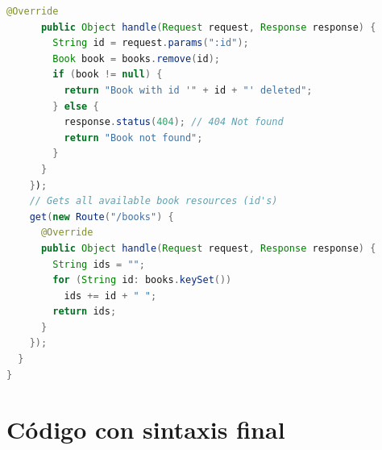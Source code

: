 \documentclass[runningheads]{llncs}
\begin{document}
\begin{center}
\begin{lstlisting}[language=java, basicstyle = \footnotesize, xleftmargin=-.1\textwidth]
      @Override
      public Object handle(Request request, Response response) {
        String id = request.params(":id");
        Book book = books.remove(id);
        if (book != null) {
          return "Book with id '" + id + "' deleted";
        } else {
          response.status(404); // 404 Not found
          return "Book not found";
        }
      }
    });
    // Gets all available book resources (id's)
    get(new Route("/books") {
      @Override
      public Object handle(Request request, Response response) {
        String ids = "";
        for (String id: books.keySet())
          ids += id + " ";
        return ids;
      }
    });
  }
}
\end{lstlisting}
\end{center}

\newpage

\section{Código con sintaxis final}
\label{app:ejemplo-xtext}
\end{document}
